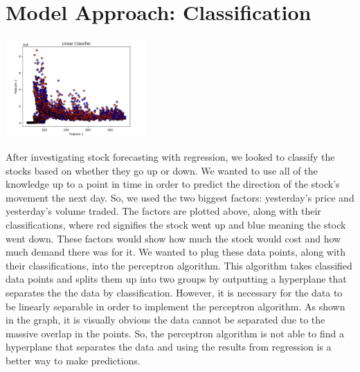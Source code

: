 \documentclass[final,5p,times,twocolumn,authoryear, 12pt]{elsarticle}
\newcommand{\kms}{km\,s$^{-1}$}
\begin{document}



\section{Model Approach: Classification}

\includegraphics[width=0.4\textwidth, angle=0]{classification.png}

After investigating stock forecasting with regression, we looked to classify the stocks based on whether they go up or down. We wanted to use all of the knowledge up to a point in time in order to predict the direction of the stock's movement the next day. So, we used the two biggest factors: yesterday's price and yesterday's volume traded. The factors are plotted above, along with their classifications, where red signifies the stock went up and blue meaning the stock went down. These factors would show how much the stock would cost and how much demand there was for it. We wanted to plug these data points, along with their classifications, into the perceptron algorithm. This algorithm takes classified data points and splits them up into two groups by outputting a hyperplane that separates the the data by classification. However, it is necessary for the data to be linearly separable in order to implement the perceptron algorithm. As shown in the graph, it is visually obvious the data cannot be separated due to the massive overlap in the points. So, the perceptron algorithm is not able to find a hyperplane that separates the data and using the results from regression is a better way to make predictions.
\end{document}
